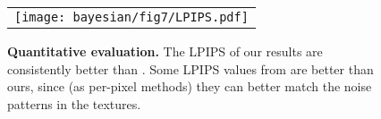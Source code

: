 \begin{figure}[h]
	\centering
	\begin{tabular}{c}
		\texttt{[image: bayesian/fig7/LPIPS.pdf]}
	\end{tabular}
	\caption[Quantitative evaluation]{\label{fig:bayesian:plot}
		\textbf{Quantitative evaluation.} The LPIPS of our results are consistently better than \cite{hu2019novel}. Some LPIPS values from \cite{deschaintre2018single} are better than ours, since (as per-pixel methods) they can better match the noise patterns in the textures.
	}
\end{figure}